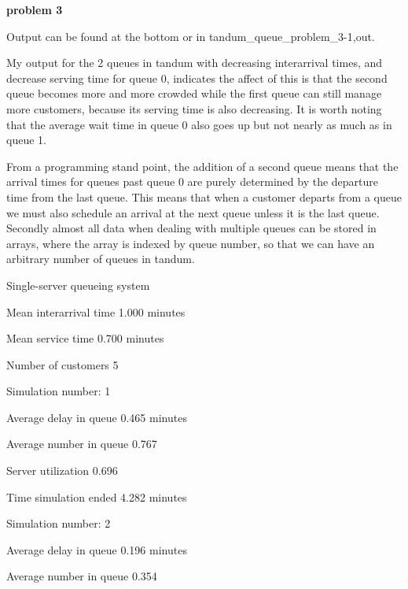 \documentclass{article}
\begin{document}
\vspace{5mm}

\textbf{problem 3}

\noindent Output can be found at the bottom or in tandum\_queue\_problem\_3-1,out.

\vspace{3mm}

\noindent My output for the 2 queues in tandum with decreasing interarrival times, and decrease serving time for queue 0, indicates the affect of this is that the second queue becomes more and more crowded while the first queue can still manage more customers, because its serving time is also decreasing. It is worth noting that the average wait time in queue 0 also goes up but not nearly as much as in queue 1.

\vspace{3mm}

\noindent From a programming stand point, the addition of a second queue means that the arrival times for queues past queue 0 are purely determined by the departure time from the last queue. This means that when a customer departs from a queue we must also schedule an arrival at the next queue unless it is the last queue. Secondly almost all data when dealing with multiple queues can be stored in arrays, where the array is indexed by queue number, so that we can have an arbitrary number of queues in tandum.

\newpage



Single-server queueing system

Mean interarrival time      1.000 minutes

Mean service time           0.700 minutes

Number of customers             5



Simulation number: 1



Average delay in queue      0.465 minutes

Average number in queue     0.767

Server utilization          0.696

Time simulation ended       4.282 minutes

Simulation number: 2



Average delay in queue      0.196 minutes

Average number in queue     0.354
\end{document}
